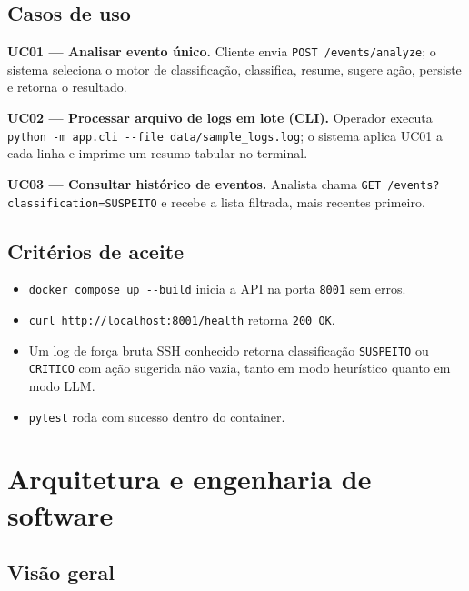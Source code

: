 \documentclass[11pt,a4paper]{article}
\begin{document}
\subsection{Casos de uso}

\textbf{UC01 --- Analisar evento único.} Cliente envia \verb|POST /events/analyze|;
o sistema seleciona o motor de classificação, classifica, resume, sugere ação,
persiste e retorna o resultado.

\textbf{UC02 --- Processar arquivo de logs em lote (CLI).} Operador executa
\verb|python -m app.cli --file data/sample_logs.log|; o sistema aplica UC01 a cada
linha e imprime um resumo tabular no terminal.

\textbf{UC03 --- Consultar histórico de eventos.} Analista chama
\verb|GET /events?classification=SUSPEITO| e recebe a lista filtrada, mais recentes
primeiro.

\subsection{Critérios de aceite}

\begin{itemize}[nosep]
  \item \verb|docker compose up --build| inicia a API na porta \texttt{8001} sem erros.
  \item \verb|curl http://localhost:8001/health| retorna \texttt{200 OK}.
  \item Um log de força bruta SSH conhecido retorna classificação \texttt{SUSPEITO}
  ou \texttt{CRITICO} com ação sugerida não vazia, tanto em modo heurístico quanto em
  modo LLM.
  \item \texttt{pytest} roda com sucesso dentro do container.
\end{itemize}

\section{Arquitetura e engenharia de software}
\label{sec:arquitetura}

\subsection{Visão geral}
\end{document}
